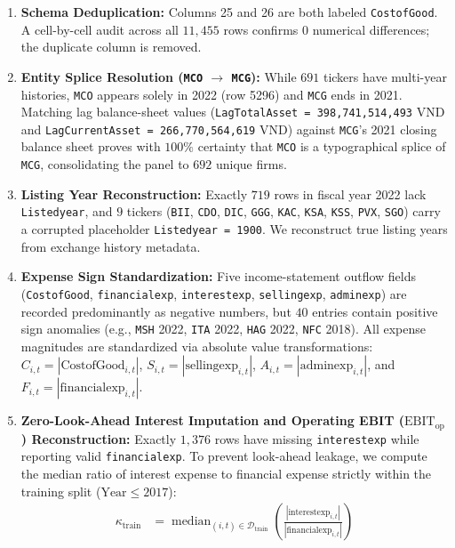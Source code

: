 \documentclass[pdflatex,sn-mathphys-num,twocolumn]{sn-jnl}
\theoremstyle{thmstyleone}
\theoremstyle{thmstyletwo}
\theoremstyle{thmstylethree}
\begin{document}
\begin{enumerate}
    \item \textbf{Schema Deduplication:} Columns 25 and 26 are both labeled \texttt{CostofGood}. A cell-by-cell audit across all $11,455$ rows confirms $0$ numerical differences; the duplicate column is removed.
    \item \textbf{Entity Splice Resolution (\texttt{MCO} $\to$ \texttt{MCG}):} While $691$ tickers have multi-year histories, \texttt{MCO} appears solely in 2022 (row 5296) and \texttt{MCG} ends in 2021. Matching lag balance-sheet values (\texttt{LagTotalAsset = 398,741,514,493} VND and \texttt{LagCurrentAsset = 266,770,564,619} VND) against \texttt{MCG}'s 2021 closing balance sheet proves with $100\%$ certainty that \texttt{MCO} is a typographical splice of \texttt{MCG}, consolidating the panel to $692$ unique firms.
    \item \textbf{Listing Year Reconstruction:} Exactly $719$ rows in fiscal year 2022 lack \texttt{Listedyear}, and $9$ tickers (\texttt{BII}, \texttt{CDO}, \texttt{DIC}, \texttt{GGG}, \texttt{KAC}, \texttt{KSA}, \texttt{KSS}, \texttt{PVX}, \texttt{SGO}) carry a corrupted placeholder \texttt{Listedyear = 1900}. We reconstruct true listing years from exchange history metadata.
    \item \textbf{Expense Sign Standardization:} Five income-statement outflow fields (\texttt{CostofGood}, \texttt{financialexp}, \texttt{interestexp}, \texttt{sellingexp}, \texttt{adminexp}) are recorded predominantly as negative numbers, but $40$ entries contain positive sign anomalies (e.g., \texttt{MSH} 2022, \texttt{ITA} 2022, \texttt{HAG} 2022, \texttt{NFC} 2018). All expense magnitudes are standardized via absolute value transformations: $C_{i,t} = |\text{CostofGood}_{i,t}|$, $S_{i,t} = |\text{sellingexp}_{i,t}|$, $A_{i,t} = |\text{adminexp}_{i,t}|$, and $F_{i,t} = |\text{financialexp}_{i,t}|$.
    \item \textbf{Zero-Look-Ahead Interest Imputation and Operating EBIT ($\text{EBIT}_{\text{op}}$) Reconstruction:} Exactly $1,376$ rows have missing \texttt{interestexp} while reporting valid \texttt{financialexp}. To prevent look-ahead leakage, we compute the median ratio of interest expense to financial expense strictly within the training split ($\text{Year} \le 2017$):
    \begin{equation}
    \begin{aligned}
        \kappa_{\text{train}} &= \operatorname{median}_{(i,t) \in \mathcal{D}_{\text{train}}} \left( \frac{|\text{interestexp}_{i,t}|}{|\text{financialexp}_{i,t}|} \right) \\

\end{aligned}
\end{equation}
\end{enumerate}
\end{document}

